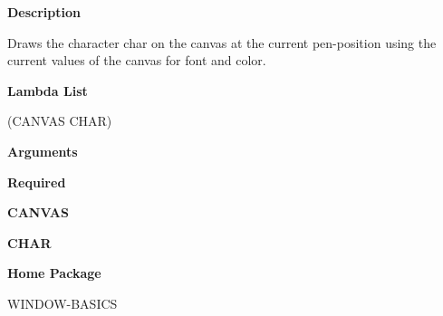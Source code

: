  
{\bf Description}

Draws the character char on the canvas at the current pen-position using the current values of the canvas for font and color.

 
{\bf Lambda List}

(CANVAS CHAR)

 
{\bf Arguments}


\beginhang
{\bf Required}\hspace{2em}
 
{\bf CANVAS}


 
{\bf CHAR}


 
\endhang
 
{\bf Home Package}

WINDOW-BASICS

